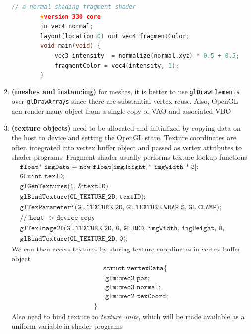 \documentclass[11pt]{article}
\newcommand{\bheading}[1]{\textbf{(#1)}}
\begin{document}
\begin{enumerate}
\begin{lstlisting}[frame=single, language=c++]
        // a normal shading fragment shader
        #version 330 core
        in vec4 normal;
        layout(location=0) out vec4 fragmentColor;
        void main(void) {
            vec3 intensity  = normalize(normal.xyz) * 0.5 + 0.5;
            fragmentColor = vec4(intensity, 1);
        }
    \end{lstlisting}
    \item \bheading{meshes and instancing} for meshes, it is better to use \texttt{glDrawElements} over \texttt{glDrawArrays} since there are substantial vertex reuse. Also, OpenGL acn render many object from a single copy of VAO and associated VBO
    \item \bheading{texture objects} need to be allocated and initialized by copying data on the host to device and setting the OpenGL state. Texture coordinates are often integrated into vertex buffer object and passed as vertex attributes to shader programs. Fragment shader usually performs texture lookup functions 
    \begin{align*}
        &\texttt{float* imgData = new float[imgHeight * imgWidth * 3]; } \\ 
        &\texttt{GLuint texID;} \\
        &\texttt{glGenTextures(1, \&textID)} \\ 
        &\texttt{glBindTexture(GL\_TEXTURE\_2D, textID);} \\
        &\texttt{glTexParameteri(GL\_TEXTURE\_2D, GL\_TEXTURE\_WRAP\_S, GL\_CLAMP); } \\ 
        &\texttt{// host -> device copy} \\ 
        &\texttt{glTexImage2D(GL\_TEXTURE\_2D, 0, GL\_RED, imgWidth, imgHeight, 0, GL\_RGB, GL\_FLOAT, imgData);} \\ 
        &\texttt{glBindTexture(GL\_TEXTURE\_2D, 0);}
    \end{align*}
    We can then access textures by storing texture coordinates in vertex buffer object 
    \begin{align*}
        &\texttt{struct vertexData} \{ \\
        &\texttt{       glm::vec3 pos;}      \\
        &\texttt{       glm::vec3 normal;}       \\
        &\texttt{       glm::vec2 texCoord;}     \\
        \} 
    \end{align*}
    Also need to bind texture to \textit{texture units}, which will be made available as a uniform variable in shader programs

\end{enumerate}
\end{document}
